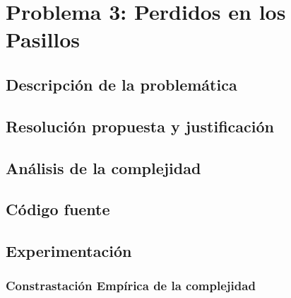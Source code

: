 \section{Problema 3: Perdidos en los Pasillos}

\subsection{Descripción de la problemática}

\subsection{Resolución propuesta y justificación}

\subsection{Análisis de la complejidad}

\subsection{Código fuente}

\subsection{Experimentación}

\subsubsection{Constrastación Empírica de la complejidad}